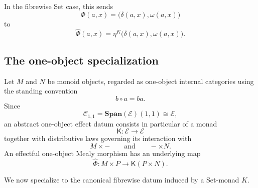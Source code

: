 In the fibrewise Set case, this sends
\[
    \Phi(a,x)
    =
    \bigl(\delta(a,x),\omega(a,x)\bigr)
\]
to
\[
    \widehat\Phi(a,x)
    =
    \eta^K
    \bigl(\delta(a,x),\omega(a,x)\bigr).
\]

\subsection{The one-object specialization}
\label{subsec:one-object-effectful-mealy-morphisms}

Let \(M\) and \(N\) be monoid objects, regarded as one-object internal
categories using the standing convention
\[
    b\circ a=ba.
\]
Since
\[
    \mathcal C_{1,1}
    =
    \mathbf{Span}(\mathcal E)(1,1)
    \cong
    \mathcal E,
\]
an abstract one-object effect datum consists in particular of a monad
\[
    \mathsf K:\mathcal E\to\mathcal E
\]
together with distributive laws governing its interaction with
\[
    M\times-
    \qquad\text{and}\qquad
    -\times N.
\]
An effectful one-object Mealy morphism has an underlying map
\[
    \widehat\Phi:
    M\times P
    \longrightarrow
    \mathsf K(P\times N).
\]

We now specialize to the canonical fibrewise datum induced by a Set-monad
\(K\).

